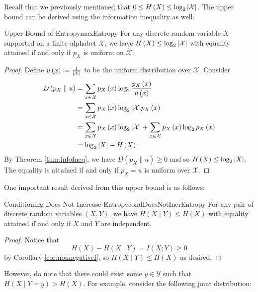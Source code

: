 \documentclass[math]{amznotes}
\theoremstyle{remark}
\begin{document}
Recall that we previously mentioned that $0 \leq H\left(X\right) \leq \log_2{\left\lvert {\mathcal{X}} \right\rvert}$. The upper bound can be derived using the information inequality as well.
\begin{probox}{Upper Bound of Entropy}{maxEntropy}
    For any discrete random variable $X$ supported on a finite alphabet $\mathcal{X}$, we have $H\left(X\right) \leq \log_2{\left\lvert {\mathcal{X}} \right\rvert}$ with equality attained if and only if $p_X$ is uniform on $\mathcal{X}$.
    \tcblower
    \begin{proof}
        Define $u\left(x\right) \coloneqq \frac{1}{{\left\lvert {\mathcal{X}} \right\rvert}}$ to be the uniform distribution over $\mathcal{X}$. Consider 
        \begin{align*}
            D\left(p_X \parallel u\right) & = \sum_{x \in \mathcal{X}}p_X\left(x\right)\log_2\frac{p_X\left(x\right)}{u\left(x\right)} \\
            & = \sum_{x \in \mathcal{X}}p_X\left(x\right)\log_2{\left\lvert {\mathcal{X}} \right\rvert}p_X\left(x\right) \\
            & = \sum_{x \in \mathcal{X}}p_X\left(x\right)\log_2{\left\lvert {\mathcal{X}} \right\rvert} + \sum_{x \in \mathcal{X}}p_X\left(x\right)\log_2p_X\left(x\right) \\
            & = \log_2{\left\lvert {X} \right\rvert} - H\left(X\right).
        \end{align*}
        By Theorem \ref{thm:infoIneq}, we have $D\left(p_X \parallel u\right) \geq 0$ and so $H\left(X\right) \leq \log_2{\left\lvert {X} \right\rvert}$. The equality is attained if and only if $p_X = u$ is uniform over $\mathcal{X}$.
    \end{proof}
\end{probox}
One important result derived from this upper bound is as follows:
\begin{corbox}{Conditioning Does Not Increase Entropy}{condDoesNotIncrEntropy}
    For any pair of discrete random variables $\left(X, Y\right)$, we have $H\left(X \mid Y\right) \leq H\left(X\right)$ with equality attained if and only if $X$ and $Y$ are independent.
    \tcblower
    \begin{proof}
        Notice that 
        \begin{equation*}
            H\left(X\right) - H\left(X \mid Y\right) = I\left(X ; Y\right) \geq 0
        \end{equation*}
        by Corollary \ref{cor:nonnegativeI}, so $H\left(X \mid Y\right) \leq H\left(X\right)$ as desired.
    \end{proof}
\end{corbox}
However, do note that there could exist some $y \in \mathcal{Y}$ such that $H\left(X \mid Y = y\right) > H\left(X\right)$. For example, consider the following joint distribution:
\end{document}

